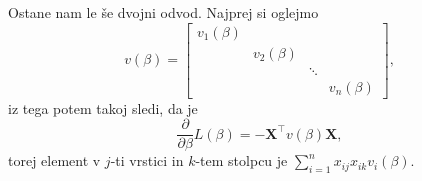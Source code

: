 \documentclass[12pt,a4paper]{amsart}
\theoremstyle{definition} %
\theoremstyle{plain} %
\begin{document}
Ostane nam le še dvojni odvod. Najprej si oglejmo
\[
    v(\beta) = \begin{bmatrix}
        v_{1}(\beta)  & & &\\
        & v_{2}(\beta) & & \\
        & & \ddots & \\
        & & & v_{n}(\beta)
    \end{bmatrix},
\]
iz tega potem takoj sledi, da je
\begin{equation} \label{drugi}
    \frac{\partial}{\partial \beta}{L}(\beta) = -\mathbf{X}^\top v(\beta)\mathbf{X},
\end{equation}
torej element v $j$-ti vrstici in $k$-tem stolpcu je $\sum_{i=1}^{n}x_{ij}x_{ik}v_{i}(\beta).$
\end{document}
